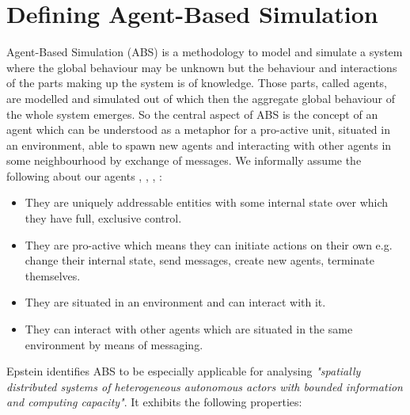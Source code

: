 \section{Defining Agent-Based Simulation}
Agent-Based Simulation (ABS) is a methodology to model and simulate a system where the global behaviour may be unknown but the behaviour and interactions of the parts making up the system is of knowledge. Those parts, called agents, are modelled and simulated out of which then the aggregate global behaviour of the whole system emerges. So the central aspect of ABS is the concept of an agent which can be understood as a metaphor for a pro-active unit, situated in an environment, able to spawn new agents and interacting with other agents in some neighbourhood by exchange of messages. 
We informally assume the following about our agents \cite{siebers_introduction_2008}, \cite{wooldridge_introduction_2009}, \cite{siebers_discrete-event_2010}, \cite{dawson_opening_2014}:

\begin{itemize}
	\item They are uniquely addressable entities with some internal state over which they have full, exclusive control.
	\item They are pro-active which means they can initiate actions on their own e.g. change their internal state, send messages, create new agents, terminate themselves.
	\item They are situated in an environment and can interact with it.
	\item They can interact with other agents which are situated in the same environment by means of messaging.
\end{itemize} 

Epstein \cite{epstein_generative_2012} identifies ABS to be especially applicable for analysing \textit{"spatially distributed systems of heterogeneous autonomous actors with bounded information and computing capacity"}. %
It exhibits the following properties:

